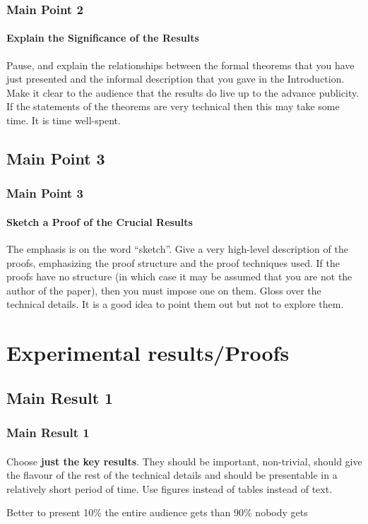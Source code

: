 \documentclass[11pt]{beamer}              %
\begin{document}
\begin{frame}
\frametitle{Main Point 2}
\framesubtitle{Explain the Significance of the Results}
Pause, and explain the relationships between the formal theorems that you have just presented and the informal description that you gave in the Introduction. Make it clear to the audience that the results do live up to the advance publicity. If the statements of the theorems are very technical then this may take some time. It is time well-spent.

\end{frame}

\subsection{Main Point 3}
\begin{frame}
\frametitle{Main Point 3}
\framesubtitle{Sketch a Proof of the Crucial Results}
The emphasis is on the word ``sketch''. Give a very high-level description of the proofs, emphasizing the proof structure and the proof techniques used. If the proofs have no structure (in which case it may be assumed that you are not the author of the paper), then you must impose one on them. Gloss over the technical details. It is a good idea to point them out but not to explore them.
\end{frame}


\section{Experimental results/Proofs}

\subsection{Main Result 1}
\begin{frame}
\frametitle{Main Result 1}
\framesubtitle{}
Choose \textbf{just the key results}. They should be important, non-trivial, should give the flavour of the rest of the technical details and should be presentable in a relatively short period of time. Use figures instead of tables instead of text.

Better to present 10\% the entire audience gets than 90\% nobody gets
\end{frame}
\end{document}
